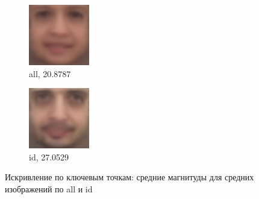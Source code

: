 \begin{figure}[h]
\centering
	\begin{subfigure}[t]{0.3\textwidth}
		\includegraphics[width=\textwidth]{results/all_warped_mean.png}
		\caption{all, 20.8787}
	\end{subfigure}
	\begin{subfigure}[t]{0.3\textwidth}
		\includegraphics[width=\textwidth]{results/id2_warped_mean.png}
		\caption{id, 27.0529}
	\end{subfigure}
	\caption{Искривление по ключевым точкам: средние магнитуды для средних изображений по all и id}
	\label{fig:exp_warp}
\end{figure}

